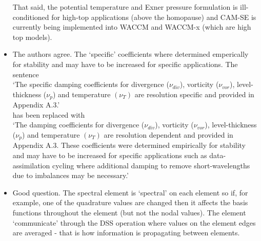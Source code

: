 \documentclass[11pt]{article}
\begin{document}
\begin{itemize}
That said, the potential temperature and Exner pressure formulation is ill-conditioned for high-top applications (above the homopause) and CAM-SE is currently being implemented into WACCM and WACCM-x (which are high top models).



\item {\color{blue}{Also in section 2.6: You make reference to the ``specific damping coefficients''. Shouldn't these be runtime-parameters? I presume that the best value of the damping will depend on the application (for example, data assimilation cycling may benefit from additional damping to remove short-wavelength waves due to imbalances) and may not be a simple function of resolution.}}

The authors agree. The `specific' coefficients where determined emperically for stability and may have to be increased for specific applications. The sentence\\

`The specific damping coefficients for divergence ($\nu_{div}$), vorticity ($\nu_{vor}$), level-thickness ($\nu_p$) and temperature $(\nu_T)$ are resolution specific and provided in Appendix A.3.'\\

has been replaced with \\

`The damping coefficients for divergence ($\nu_{div}$), vorticity ($\nu_{vor}$), level-thickness ($\nu_p$) and temperature $(\nu_T)$ are resolution dependent and provided in Appendix A.3. These coefficients were determined empirically for stability and may have to be increased for specific applications such as data-assimilation cycling where additional damping to remove short-wavelengths due to imbalances may be necessary.'

\item {\color{blue}{ Section 3.3: I am unfamiliar with the spectral element method. In traditional finite-differencing schemes there is a well defined way for each grid point to be influenced by its neighbors. How does each element communicate with one another? Is it by the shared points on the edges of each element? Also, if indeed it is only by the edge points, then wouldn't a broader domain of dependence (with more points) be needed for a higher-order method?}}

Good question. The spectral element is `spectral' on each element so if, for example, one of the quadrature values are changed then it affects the basis functions throughout the element (but not the nodal values). The element `communicate' through the DSS operation where values on the element edges are averaged - that is how information is propagating between elements.


\end{itemize}
\end{document}
